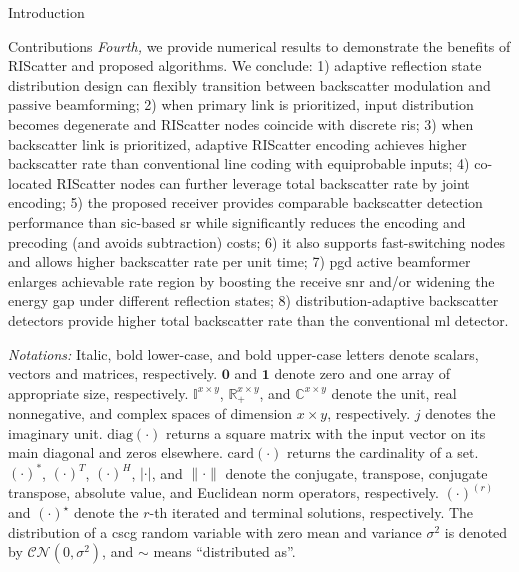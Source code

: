 \documentclass[journal]{IEEEtran}
\begin{document}
\begin{section}{Introduction}
\begin{subsection}{Contributions}
		\emph{Fourth,} we provide numerical results to demonstrate the benefits of RIScatter and proposed algorithms.
		We conclude:
		1) adaptive reflection state distribution design can flexibly transition between backscatter modulation and passive beamforming;
		2) when primary link is prioritized, input distribution becomes degenerate and RIScatter nodes coincide with discrete \gls{ris};
		3) when backscatter link is prioritized, adaptive RIScatter encoding achieves higher backscatter rate than conventional line coding with equiprobable inputs;
		4) co-located RIScatter nodes can further leverage total backscatter rate by joint encoding;
		5) the proposed receiver provides comparable backscatter detection performance than \gls{sic}-based \gls{sr} while significantly reduces the encoding and precoding (and avoids subtraction) costs;
		6) it also supports fast-switching nodes and allows higher backscatter rate per unit time;
		7) \gls{pgd} active beamformer enlarges achievable rate region by boosting the receive \gls{snr} and/or widening the energy gap under different reflection states;
		8) distribution-adaptive backscatter detectors provide higher total backscatter rate than the conventional \gls{ml} detector.
	\end{subsection}

	\emph{Notations:}
	Italic, bold lower-case, and bold upper-case letters denote scalars, vectors and matrices, respectively.
	$\boldsymbol{0}$ and $\boldsymbol{1}$ denote zero and one array of appropriate size, respectively. $\mathbb{I}^{x \times y}$, $\mathbb{R}_+^{x \times y}$, and $\mathbb{C}^{x \times y}$ denote the unit, real nonnegative, and complex spaces of dimension $x \times y$, respectively.
	$j$ denotes the imaginary unit.
	$\mathrm{diag}(\cdot)$ returns a square matrix with the input vector on its main diagonal and zeros elsewhere.
	$\mathrm{card}(\cdot)$ returns the cardinality of a set.
	$(\cdot)^*$, $(\cdot)^T$, $(\cdot)^H$, $\lvert{\cdot}\rvert$, and $\lVert{\cdot}\rVert$ denote the conjugate, transpose, conjugate transpose, absolute value, and Euclidean norm operators, respectively.
	$(\cdot)^{(r)}$ and $(\cdot)^{\star}$ denote the $r$-th iterated and terminal solutions, respectively.
	The distribution of a \gls{cscg} random variable with zero mean and variance $\sigma^2$ is denoted by $\mathcal{CN}(0,\sigma^2)$, and $\sim$ means ``distributed as''.
\end{section}
\end{document}
